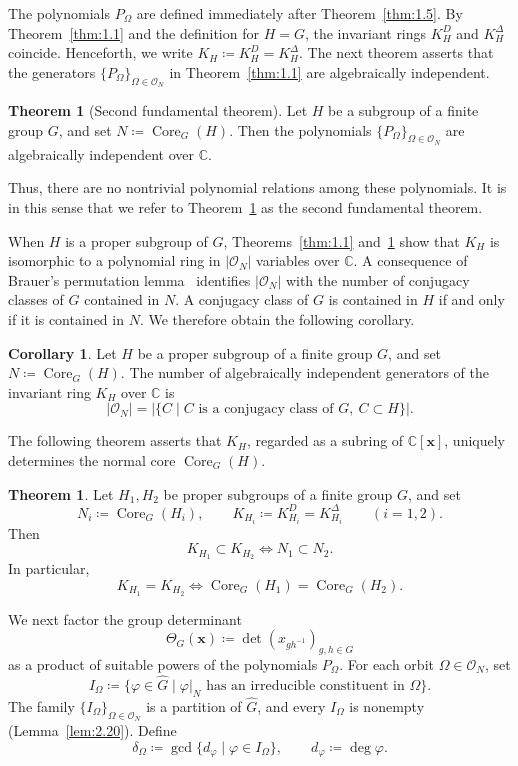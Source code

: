 \documentclass[12pt,a4paper]{article}
\theoremstyle{definition}
\newtheorem{thm}[definition]{Theorem}
\newtheorem{cor}[definition]{Corollary}
\numberwithin{definition}{section}
\DeclareMathOperator{\Core}{Core}
\begin{document}
The polynomials $P_\Omega$ are defined immediately after
Theorem~\ref{thm:1.5}.
By Theorem~\ref{thm:1.1} and the definition for $H=G$, the invariant rings
$K_H^D$ and $K_H^\Delta$ coincide. Henceforth, we write
$K_H\coloneqq K_H^D=K_H^\Delta$.
The next theorem asserts that the generators
$\{P_\Omega\}_{\Omega\in\mathcal O_N}$ in Theorem~\ref{thm:1.1}
are algebraically independent.

\begin{thm}[Second fundamental theorem]\label{thm:1.2}
Let $H$ be a subgroup of a finite group $G$, and set
$N\coloneqq\Core_G(H)$. Then the polynomials
$\{P_\Omega\}_{\Omega\in\mathcal O_N}$ are algebraically independent
over $\mathbb C$.
\end{thm}

Thus, there are no nontrivial polynomial relations among these polynomials.
It is in this sense that we refer to Theorem~\ref{thm:1.2} as the second
fundamental theorem.

When $H$ is a proper subgroup of $G$, Theorems~\ref{thm:1.1}
and~\ref{thm:1.2} show that $K_H$ is isomorphic to a polynomial ring in
$|\mathcal O_N|$ variables over $\mathbb C$.
A consequence of Brauer's permutation lemma~\cite[Corollary~6.33]{MR460423}
identifies $|\mathcal O_N|$ with the number of conjugacy classes of $G$
contained in $N$.
A conjugacy class of $G$ is contained in $H$ if and only if it is contained
in $N$. We therefore obtain the following corollary.

\begin{cor}\label{cor:1.3}
Let $H$ be a proper subgroup of a finite group $G$, and set
$N\coloneqq\Core_G(H)$. The number of algebraically independent generators
of the invariant ring $K_H$ over $\mathbb C$ is
\[
|\mathcal O_N|
=|\{C\mid C\text{ is a conjugacy class of }G,\ C\subset H\}|.
\]
\end{cor}

The following theorem asserts that $K_H$, regarded as a subring of
$\mathbb C[\bm x]$, uniquely determines the normal core $\Core_G(H)$.

\begin{thm}\label{thm:1.4}
Let $H_1,H_2$ be proper subgroups of a finite group $G$, and set
\[
N_i\coloneqq\Core_G(H_i),
\qquad
K_{H_i}\coloneqq K_{H_i}^D=K_{H_i}^\Delta
\qquad(i=1,2).
\]
Then
\[
K_{H_1}\subset K_{H_2}
\iff
N_1\subset N_2.
\]
In particular,
\[
K_{H_1}=K_{H_2}
\iff
\Core_G(H_1)=\Core_G(H_2).
\]
\end{thm}

We next factor the group determinant
\[
\Theta_G(\bm x)\coloneqq\det(x_{gh^{-1}})_{g,h\in G}
\]
as a product of suitable powers of the polynomials $P_\Omega$.
For each orbit $\Omega\in\mathcal O_N$, set
\[
I_\Omega\coloneqq
\{\varphi\in\widehat G\mid
\varphi|_N\text{ has an irreducible constituent in }\Omega\}.
\]
The family $\{I_\Omega\}_{\Omega\in\mathcal O_N}$ is a partition of
$\widehat G$, and every $I_\Omega$ is nonempty
(Lemma~\ref{lem:2.20}). Define
\[
\delta_\Omega\coloneqq\gcd\{d_\varphi\mid\varphi\in I_\Omega\},
\qquad d_\varphi\coloneqq\deg\varphi.
\]
\end{document}
